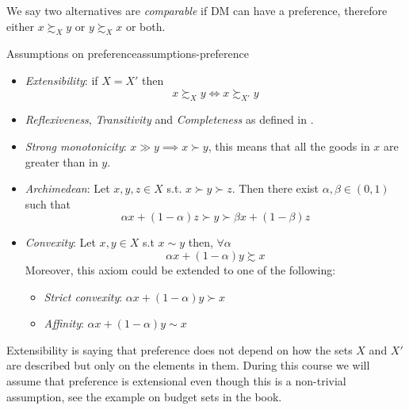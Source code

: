 \documentclass[12pt]{extarticle}
\begin{document}
We say two alternatives are \emph{comparable} if DM can have a preference, therefore either $x \succsim_X y$ or $y \succsim_X x$ or both.

\begin{proposition}{Assumptions on preference}{assumptions-preference}
    \begin{itemize}
        \item
              \emph{Extensibility}: if $X = X'$ then
              \begin{equation}
                  x \succsim_X y \iff x \succsim_{X'} y
              \end{equation}
        \item \emph{Reflexiveness}, \emph{Transitivity} and \emph{Completeness} as defined in .
        \item \emph{Strong monotonicity}: $x \gg y \implies x \succ y$, this means that all the goods in $x$ are greater than in $y$.
        \item \emph{Archimedean}: Let $x, y, z \in X$ s.t. $x \succ y \succ z$.
              Then there exist $\alpha, \beta \in (0, 1)$ such that
              \begin{equation}
                  \alpha x + (1-\alpha) z \succ y \succ \beta x + (1-\beta)z
              \end{equation}
        \item \emph{Convexity}: Let $x, y \in X$ s.t $x \sim y$ then, $\forall \alpha$
              \begin{equation}
                  \alpha x + (1-\alpha) y \succsim x
              \end{equation}
              Moreover, this axiom could be extended to one of the following:
              \begin{itemize}
                  \item \emph{Strict convexity}: $\alpha x + (1-\alpha) y \succ x$
                  \item \emph{Affinity}: $\alpha x + (1-\alpha) y \sim x$
              \end{itemize}
    \end{itemize}
\end{proposition}

Extensibility is saying that preference does not depend on how the sets $X$ and $X'$ are described but only on the elements in them.
During this course we will assume that preference is extensional even though this is a non-trivial assumption, see the example on budget sets in the book.
\end{document}
